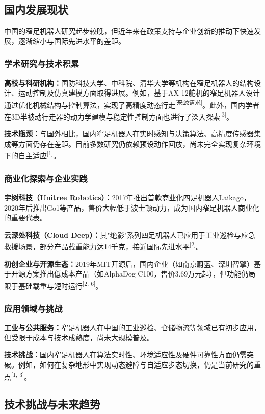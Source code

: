\documentclass[a4paper,fontset=windows]{ctexart}
\begin{document}
\subsection{国内发展现状}
中国的窄足机器人研究起步较晚，但近年来在政策支持与企业创新的推动下快速发展，逐渐缩小与国际先进水平的差距。

\subsubsection{学术研究与技术积累}
\textbf{高校与科研机构：}国防科技大学、中科院、清华大学等机构在窄足机器人的结构设计、运动控制及仿真建模方面取得进展。例如，基于AX-12舵机的窄足机器人设计通过优化机械结构与控制算法，实现了高精度动态行走\textsuperscript{[来源请求]}。此外，国内学者在3D半被动行走器的动力学建模与稳定性控制方面也进行了深入探索\textsuperscript{[3]}。

\textbf{技术瓶颈：}与国外相比，国内窄足机器人在实时感知与决策算法、高精度传感器集成等方面仍存在差距。目前多数研究仍依赖预设动作回放，尚未完全实现复杂环境下的自主适应\textsuperscript{[1]}。

\subsubsection{商业化探索与企业实践}
\textbf{宇树科技（Unitree Robotics）：}2017年推出首款商业化四足机器人Laikago，2020年后推出Go1等产品，售价大幅低于波士顿动力，成为国内窄足机器人商业化的重要代表。

\textbf{云深处科技（Cloud Deep）：}其"绝影"系列四足机器人已应用于工业巡检与应急救援场景，部分产品载重能力达14千克，接近国际先进水平\textsuperscript{[2]}。

\textbf{初创企业与开源生态：}2019年MIT开源后，国内企业（如南京蔚蓝、深圳智擎）基于开源方案推出低成本产品（如AlphaDog C100，售价3.69万元起），但功能仍局限于基础载重与短时运行\textsuperscript{[2, 6]}。

\subsubsection{应用领域与挑战}
\textbf{工业与公共服务：}窄足机器人在中国的工业巡检、仓储物流等领域已有初步应用，但受限于成本与技术成熟度，尚未大规模普及。

\textbf{技术挑战：}国内窄足机器人在算法实时性、环境适应性及硬件可靠性方面仍需突破。例如，如何在复杂地形中实现动态避障与自适应步态切换，仍是当前研究的重点\textsuperscript{[1, 3]}。

\subsection{技术挑战与未来趋势}
\end{document}
